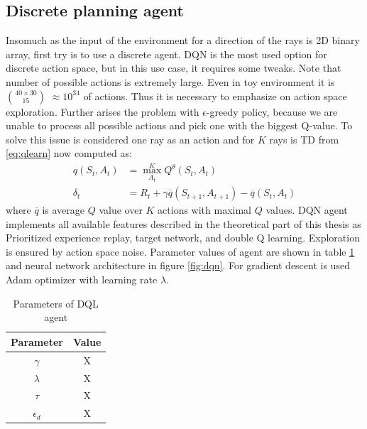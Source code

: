\subsection{Discrete planning agent}
Insomuch as the input of the environment for a direction of the rays is 2D binary array, first try is to use a discrete agent. DQN is the most used option for discrete action space, but in this use case, it requires some tweaks. Note that number of possible actions is extremely large. Even in toy environment it is $40\times30 \choose 15$ $\approx 10^{34}$ of actions. Thus it is necessary to emphasize on action space exploration. Further arises the problem with $\epsilon$-greedy policy, because we are unable to process all possible actions and pick one with the biggest Q-value. To solve this issue is considered one ray as an action and for $K$ rays is TD from \eqref{eq:qlearn} now computed as:
\begin{align}
q(S_t, A_t) &= \max\limits_{A_t}^K Q^\theta(S_t, A_t)\\
\delta_t &= R_t + \gamma \overline{q}(S_{t+1}, A_{t+1}) - \overline{q}(S_t, A_t)
\end{align}
where $\overline{q}$ is average $Q$ value over $K$ actions with maximal $Q$ values. DQN agent implements all available features described in the theoretical part of this thesis as Prioritized experience replay, target network, and double Q learning. Exploration is ensured by action space noise. Parameter values of agent are shown in table \ref{tab:dqlparam} and neural network architecture in figure \ref{fig:dqn}. For gradient descent is used Adam optimizer with learning rate $\lambda$.

\begin{table}[H]
  \centering
  \begin{tabular}{*{2}{c}}
    \toprule
    Parameter & Value \\
    \midrule
    $\gamma$ & X \\
    $\lambda$ & X \\
    $\tau$ & X \\
    $\epsilon_d$ & X \\
    \bottomrule
  \end{tabular}
  \caption{Parameters of DQL agent}
  \label{tab:dqlparam}
\end{table}
\pagebreak

